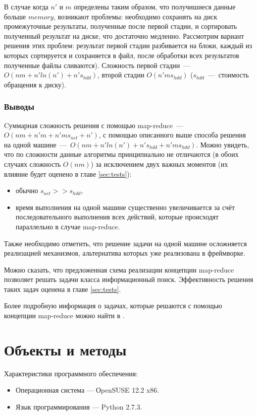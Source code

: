 \documentclass[12pt,a4paper,oneside]{extarticle}
\begin{document}
            В случае когда $n'$ и $m$ определены таким образом, что получишиеся данные больше $memory$, возникают проблемы: необходимо сохранять на диск промежуточные результаты, полученные после первой стадии, и сортировать полученный результат на диске, что достаточно медленно. Рассмотрим вариант решения этих проблем: результат первой стадии разбивается на блоки, каждый из которых сортируется и сохраняется в файл, после обработки всех результатов полученные файлы сливаются). Сложность первой стадии~---~$O(nm+n'ln(n')+n's_{hdd})$, второй стадии $O(n'ms_{hdd})$ ($s_{hdd}$~---~стоимость обращения к диску).

        \subsubsection{Выводы}
            Cуммарная сложность решения с помощью map-reduce~---~$O(nm+n'm+n'ms_{net}+n')$, с помощью описанного выше способа решения на одной машине~---~$O(nm+n'ln(n')+n's_{hdd}+n'ms_{hdd})$. Можно увидеть, что по сложности данные алгоритмы принципиально не отличаются (в обоих случаях сложность $O(nm)$) за исключением двух важных моментов (их влияние будет оценено в главе \ref{sec:tests}):
            \begin{itemize}
                \item обычно $s_{net}>>s_{hdd}$,
                \item время выполнения на одной машине существенно увеличивается за счёт последовательного выполнения всех действий, которые происходят параллельно в случае map-reduce.
            \end{itemize}

            Также необходимо отметить, что решение задачи на одной машине осложняется реализацией механизмов, альтернатива которых уже реализована в фреймворке. 

            Можно сказать, что предложенная схема реализации концепции map-reduce позволяет решать задачи класса информационный поиск. Эффективность решения таких задач оценена в главе \ref{sec:tests}.

            Более подробную информация о задачах, которые решаются с помощью концепции map-reduce можно найти в \cite{mr_patterns}.
        
\clearpage

\section{Объекты и методы}
\label{sec:configuration} 
        \noindent Характеристики программного обеспечения:
        \begin{itemize}
            \item Операционная система --- ОpenSUSE 12.2 x86.
            \item Язык программирования --- Python 2.7.3.
        \end{itemize}
        
\end{document}
